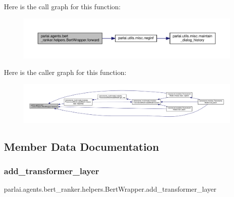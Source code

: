 Here is the call graph for this function\+:
\nopagebreak
\begin{figure}[H]
\begin{center}
\leavevmode
\includegraphics[width=350pt]{classparlai_1_1agents_1_1bert__ranker_1_1helpers_1_1BertWrapper_a29a138ccda9ff978a641e5f6e0949009_cgraph}
\end{center}
\end{figure}
Here is the caller graph for this function\+:
\nopagebreak
\begin{figure}[H]
\begin{center}
\leavevmode
\includegraphics[width=350pt]{classparlai_1_1agents_1_1bert__ranker_1_1helpers_1_1BertWrapper_a29a138ccda9ff978a641e5f6e0949009_icgraph}
\end{center}
\end{figure}


\subsection{Member Data Documentation}
\mbox{\label{classparlai_1_1agents_1_1bert__ranker_1_1helpers_1_1BertWrapper_ae1ec954dac72452d7b156a15f488c024}} 
\subsubsection{\texorpdfstring{add\+\_\+transformer\+\_\+layer}{add\_transformer\_layer}}
{\footnotesize\ttfamily parlai.\+agents.\+bert\+\_\+ranker.\+helpers.\+Bert\+Wrapper.\+add\+\_\+transformer\+\_\+layer}



